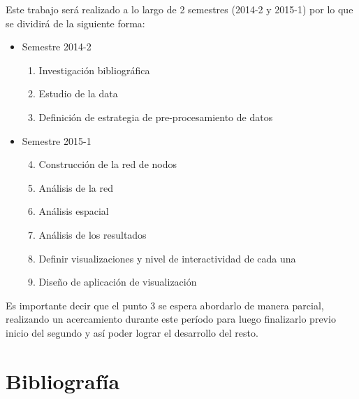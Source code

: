 \documentclass[itshape,12pt]{article}
\begin{document}
          Este trabajo será realizado a lo largo de 2 semestres (2014-2 y 2015-1) por lo que se dividirá de la siguiente forma:

              \begin{itemize}
          \item Semestre 2014-2
              \begin{enumerate}
          \item Investigación bibliográfica 
              \item Estudio de la data
              \item Definición de estrategia de pre-procesamiento de datos
              \end{enumerate}
          \item Semestre 2015-1
              \begin{enumerate}\setcounter{enumi}{3}
          \item Construcción de la red de nodos
              \item Análisis de la red
              \item Análisis espacial
              \item Análisis de los resultados
              \item Definir visualizaciones y nivel de interactividad de cada una
              \item Diseño de aplicación de visualización
              \end{enumerate}
          \end{itemize}

          Es importante decir que el punto 3 se espera abordarlo de manera parcial, realizando un acercamiento durante este período para luego finalizarlo previo inicio del segundo y así poder lograr el desarrollo del resto.

              \newpage
              \section{Bibliografía}
\end{document}
